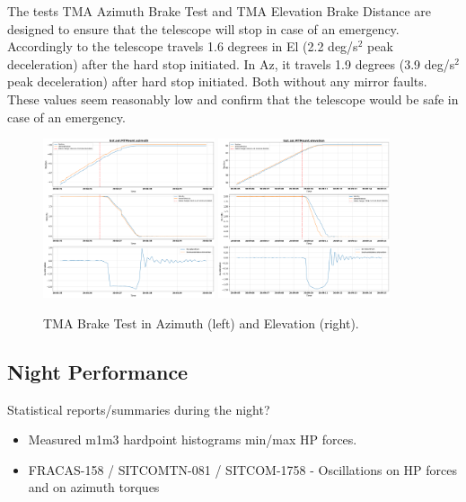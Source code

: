 The tests  TMA Azimuth Brake Test and
 TMA Elevation Brake Distance are designed to ensure that the
telescope will stop in case of an emergency. Accordingly to 
the telescope travels 1.6 degrees in El (2.2 deg/s$^2$ peak deceleration) after the hard stop initiated.
In Az, it travels 1.9 degrees (3.9 deg/s$^2$ peak deceleration) after hard stop initiated.
Both without any mirror faults. These values seem reasonably low and confirm that the telescope
would be safe in case of an emergency.

\begin{figure}
  \centering
  \includegraphics[width=0.45\textwidth]{spa/20_vel_acc_jerk/BLOCK-T231_az_brake_tests.png}
  \qquad
  \includegraphics[width=0.45\textwidth]{spa/20_vel_acc_jerk/BLOCK-T240_el_brake_tests.png}
  \caption{TMA Brake Test in Azimuth (left) and Elevation (right).}
  \label{fig:block240_azEl_brake_distance}
\end{figure}

\subsection{Night Performance}

Statistical reports/summaries during the night?
\begin{itemize}
    \item Measured m1m3 hardpoint histograms min/max HP forces.
    \item FRACAS-158 / SITCOMTN-081 / SITCOM-1758 - Oscillations on HP forces and on azimuth torques
\end{itemize}
